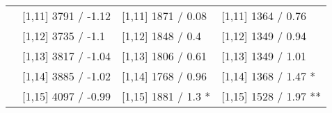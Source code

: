 \begin{table}
\begin{tabular}[t]{llll}
 & {}[1,11] 3791  / -1.12 & {}[1,11] 1871  / 0.08 & {}[1,11] 1364  / 0.76\\
 & {}[1,12] 3735  / -1.1 & {}[1,12] 1848  / 0.4 & {}[1,12] 1349  / 0.94\\
\addlinespace
 & {}[1,13] 3817  / -1.04 & {}[1,13] 1806  / 0.61 & {}[1,13] 1349  / 1.01\\
 & {}[1,14] 3885  / -1.02 & {}[1,14] 1768  / 0.96 & {}[1,14] 1368  / 1.47 *\\
 & {}[1,15] 4097  / -0.99 & {}[1,15] 1881  / 1.3 * & {}[1,15] 1528  / 1.97 **\\
\bottomrule
\end{tabular}
\end{table}
